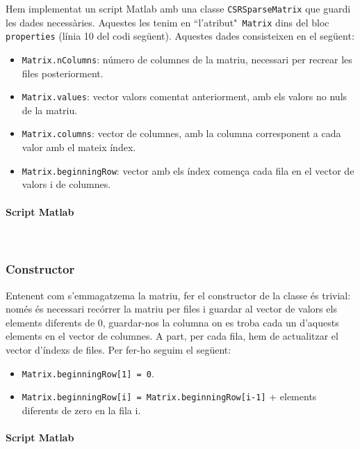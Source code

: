 \documentclass[11pt,a4paper,twoside]{report}
\begin{document}
	Hem implementat un script Matlab amb una classe \texttt{CSRSparseMatrix} que guardi les dades necessàries. Aquestes les tenim en ``l'atribut"\texttt{ Matrix} dins del bloc \texttt{properties} (línia 10 del codi següent). Aquestes dades consisteixen en el següent:	
	\begin{itemize}
	\item  \texttt{Matrix.nColumns}: número de columnes de la matriu, necessari per recrear les files posteriorment.
	\item  \texttt{Matrix.values}: vector valors comentat anteriorment, amb els valors no nuls de la matriu.
	\item  \texttt{Matrix.columns}: vector de columnes, amb la columna corresponent a cada valor amb el mateix índex.
	\item  \texttt{Matrix.beginningRow}: vector amb els índex comença cada fila en el vector de valors i de columnes.
	\end{itemize}
	
	\paragraph*{Script Matlab}\mbox{}\\
	
	
	
	\subsubsection{Constructor}
	Entenent com s'emmagatzema la matriu, fer el constructor de la classe és trivial: només és necessari recórrer la matriu per files i guardar al vector de valors els elements diferents de 0, guardar-nos la columna on es troba cada un d'aquests elements en el vector de columnes. A part, per cada fila, hem de actualitzar el vector d'índexs de files. Per fer-ho seguim el següent:
	\begin{itemize}
	\item \texttt{Matrix.beginningRow[1] = 0}.
	\item \texttt{Matrix.beginningRow[i] = Matrix.beginningRow[i-1]} + elements diferents de zero en la fila i.
	\end{itemize}
	
	\paragraph*{Script Matlab} \mbox{} \\
	
\end{document}
